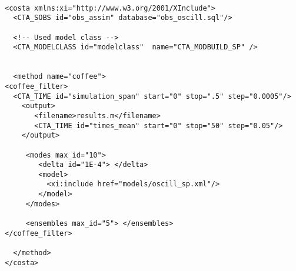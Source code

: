 \begin{verbatim}

<costa xmlns:xi="http://www.w3.org/2001/XInclude">
  <CTA_SOBS id="obs_assim" database="obs_oscill.sql"/>

  <!-- Used model class -->
  <CTA_MODELCLASS id="modelclass"  name="CTA_MODBUILD_SP" />


  <method name="coffee"> 
<coffee_filter>
  <CTA_TIME id="simulation_span" start="0" stop=".5" step="0.0005"/>
    <output>
       <filename>results.m</filename>
       <CTA_TIME id="times_mean" start="0" stop="50" step="0.05"/>
    </output>

     <modes max_id="10">
        <delta id="1E-4"> </delta>
        <model>
          <xi:include href="models/oscill_sp.xml"/>
        </model>        
     </modes>

     <ensembles max_id="5"> </ensembles>
</coffee_filter>
  
  </method> 
</costa>
\end{verbatim}

